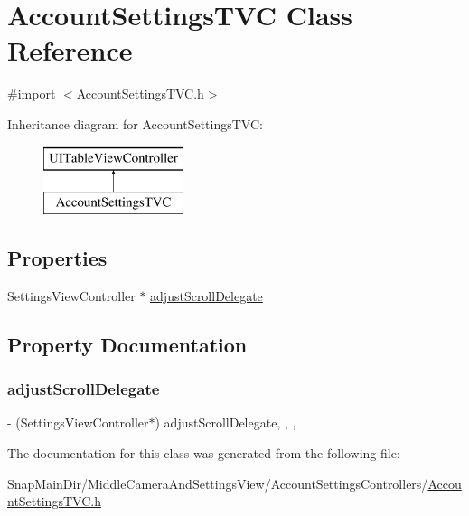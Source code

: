 \hypertarget{interface_account_settings_t_v_c}{}\section{Account\+Settings\+T\+VC Class Reference}
\label{interface_account_settings_t_v_c}


{\ttfamily \#import $<$Account\+Settings\+T\+V\+C.\+h$>$}

Inheritance diagram for Account\+Settings\+T\+VC\+:\begin{figure}[H]
\begin{center}
\leavevmode
\includegraphics[height=2.000000cm]{interface_account_settings_t_v_c}
\end{center}
\end{figure}
\subsection*{Properties}
\begin{DoxyCompactItemize}
\item 
Settings\+View\+Controller $\ast$ \hyperlink{interface_account_settings_t_v_c_af3df6bec9256a333d883ed85c006d6a9}{adjust\+Scroll\+Delegate}
\end{DoxyCompactItemize}


\subsection{Property Documentation}
\hypertarget{interface_account_settings_t_v_c_af3df6bec9256a333d883ed85c006d6a9}{}\label{interface_account_settings_t_v_c_af3df6bec9256a333d883ed85c006d6a9} 
\subsubsection{\texorpdfstring{adjust\+Scroll\+Delegate}{adjustScrollDelegate}}
{\footnotesize\ttfamily -\/ (Settings\+View\+Controller$\ast$) adjust\+Scroll\+Delegate\hspace{0.3cm}{\ttfamily [read]}, {\ttfamily [write]}, {\ttfamily [nonatomic]}, {\ttfamily [weak]}}



The documentation for this class was generated from the following file\+:\begin{DoxyCompactItemize}
\item 
Snap\+Main\+Dir/\+Middle\+Camera\+And\+Settings\+View/\+Account\+Settings\+Controllers/\hyperlink{_account_settings_t_v_c_8h}{Account\+Settings\+T\+V\+C.\+h}\end{DoxyCompactItemize}
